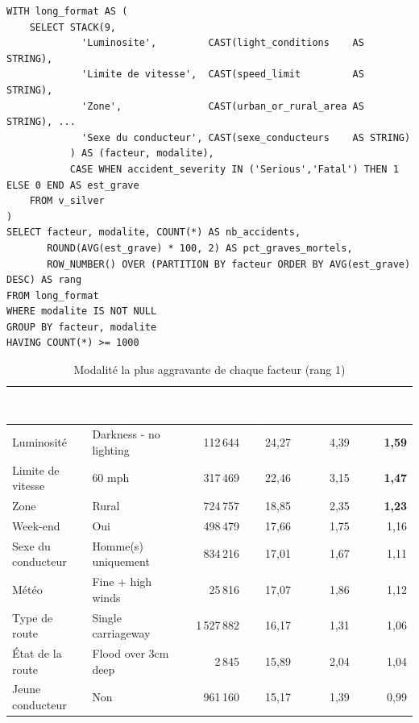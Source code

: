 \documentclass[11pt,a4paper]{report}
\newcommand{\hd}[1]{\textcolor{white}{\bfseries #1}}
\newcommand{\headrow}{\rowcolor{primary}}
\begin{document}
\begin{lstlisting}[language=SparkSQL]
WITH long_format AS (
    SELECT STACK(9,
             'Luminosite',         CAST(light_conditions    AS STRING),
             'Limite de vitesse',  CAST(speed_limit         AS STRING),
             'Zone',               CAST(urban_or_rural_area AS STRING), ...
             'Sexe du conducteur', CAST(sexe_conducteurs    AS STRING)
           ) AS (facteur, modalite),
           CASE WHEN accident_severity IN ('Serious','Fatal') THEN 1 ELSE 0 END AS est_grave
    FROM v_silver
)
SELECT facteur, modalite, COUNT(*) AS nb_accidents,
       ROUND(AVG(est_grave) * 100, 2) AS pct_graves_mortels,
       ROW_NUMBER() OVER (PARTITION BY facteur ORDER BY AVG(est_grave) DESC) AS rang
FROM long_format
WHERE modalite IS NOT NULL
GROUP BY facteur, modalite
HAVING COUNT(*) >= 1000
\end{lstlisting}

\begin{table}[H]
\centering
\small
{}
\begin{tabularx}{\textwidth}{@{}l X r r r r@{}}
\toprule
\headrow \hd{Facteur} & \hd{Modalité la plus grave} & \hd{Accidents} & \hd{\% graves} & \hd{\% mortels} & \hd{Risque rel.} \\
\midrule
Luminosité & Darkness - no lighting & 112\,644 & 24,27 & 4,39 & \textbf{1,59} \\
Limite de vitesse & 60 mph & 317\,469 & 22,46 & 3,15 & \textbf{1,47} \\
Zone & Rural & 724\,757 & 18,85 & 2,35 & \textbf{1,23} \\
Week-end & Oui & 498\,479 & 17,66 & 1,75 & 1,16 \\
Sexe du conducteur & Homme(s) uniquement & 834\,216 & 17,01 & 1,67 & 1,11 \\
Météo & Fine + high winds & 25\,816 & 17,07 & 1,86 & 1,12 \\
Type de route & Single carriageway & 1\,527\,882 & 16,17 & 1,31 & 1,06 \\
État de la route & Flood over 3cm deep & 2\,845 & 15,89 & 2,04 & 1,04 \\
Jeune conducteur & Non & 961\,160 & 15,17 & 1,39 & 0,99 \\
\bottomrule
\end{tabularx}
\caption{Modalité la plus aggravante de chaque facteur (rang 1)}
\end{table}
\end{document}
